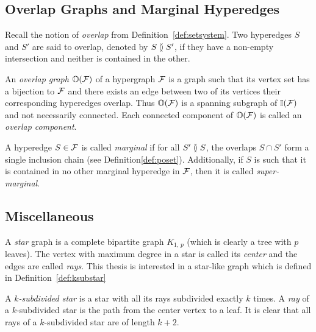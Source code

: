 
\subsection{Overlap Graphs and Marginal Hyperedges}
\label{sec:overlapmarginal}
Recall the notion of {\em overlap} from
Definition~\ref{def:setsystem}.  Two hyperedges $S$ and $S'$ are said
to overlap, denoted by $S \between S'$, if they have a non-empty
intersection and neither is contained in the other.

An {\em overlap graph}  $\mathbb O({\cal F})$ of a hypergraph ${\cal F}$ is a graph
such that its vertex set has a bijection to ${\cal F}$ and there exists an
edge between two of its vertices \iff their corresponding hyperedges
overlap.  Thus $\mathbb O({\cal F})$ is a spanning subgraph of $\mathbb I({\cal F})$ and not
necessarily connected. Each connected component of $\mathbb O({\cal F})$ is
called an {\em overlap component}.

A hyperedge $S \in {\cal F}$ is called {\em marginal} if for all $S'
\between S$, the overlaps $S \cap S'$ form a single inclusion chain
\cite{kklv10} (see Definition\ref{def:poset}). Additionally, if $S$ is
such that it is contained in no other marginal hyperedge in ${\cal F}$,
then it is called {\em super-marginal}.

\subsection{Miscellaneous}
\label{sec:miscprelim}
A {\em star} graph is a complete bipartite graph $K_{1,\,p}$ (which is
clearly a tree with $p$ leaves). The vertex with maximum degree in a
star is called its {\em center} and the edges are called {\em
  rays}. This thesis is interested in a star-like graph which is
defined in Definition~\ref{def:ksubstar}

\begin{definition}
  \label{def:ksubstar}
  A {\em $k$-subdivided star} is a star with all its rays subdivided
  exactly $k$ times. A {\em ray} of a $k$-subdivided star is the path
  from the center vertex to a leaf. It is clear that all rays of a
  $k$-subdivided star are of length $k+2$.
\end{definition}


